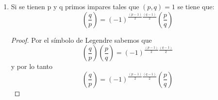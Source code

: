\documentclass[12pt, letterpaper]{article}
\begin{document}
\begin{enumerate}
\begin{proof}
Por lo anterior podemos generalizarlo para descomponer n en varios primos de forma que $(\frac{2}{n})= \prod_{i=1}^k \frac{2}{P_i^{e_i}}$
Y por el resultado anterior
\[
\left(\frac{2}{n}\right)= \prod_{i=1}^k \left(-1\right)^{e_1\left(P_i^2-1\right)/8}= \left(-1\right)^{\sum_{i=1}^k e_1\left(P_i^2-1\right)/8}= \left(-1\right)^{\left(n^2-1\right)/8}
\]

\end{proof}
\item Si se tienen p y q primos impares tales que $(p, q) = 1$ se tiene que:
\[
\left(\frac{q}{p}\right)= \left(-1\right)^{\frac{\left(p-1\right)}{2}\frac{\left(q-1\right)}{2}}\left(\frac{p}{q}\right)
\]
\begin{proof}
Por el símbolo de Legendre sabemos que 
\[
\left(\frac{q}{p}\right)\left(\frac{p}{q}\right)= \left(-1\right)^{\frac{\left(p-1\right)}{2}\frac{\left(q-1\right)}{2}}
\]
y por lo tanto
\[
\left(\frac{q}{p}\right)= \left(-1\right)^{\frac{\left(p-1\right)}{2}\frac{\left(q-1\right)}{2}}\left(\frac{p}{q}\right)
\]
\end{proof}

\end{enumerate}
\end{document}
